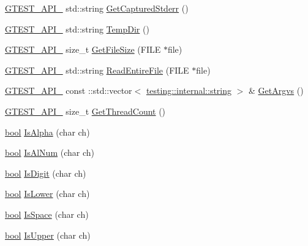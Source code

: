 \begin{DoxyCompactItemize}
\item 
\hyperlink{gtest-port_8h_aa73be6f0ba4a7456180a94904ce17790}{G\+T\+E\+S\+T\+\_\+\+A\+P\+I\+\_\+} std\+::string \hyperlink{namespacetesting_1_1internal_a374156401da17704099d0c33fa53adfb}{Get\+Captured\+Stderr} ()
\item 
\hyperlink{gtest-port_8h_aa73be6f0ba4a7456180a94904ce17790}{G\+T\+E\+S\+T\+\_\+\+A\+P\+I\+\_\+} std\+::string \hyperlink{namespacetesting_1_1internal_a59a959f437bd7d515b5c41dcf00229c9}{Temp\+Dir} ()
\item 
\hyperlink{gtest-port_8h_aa73be6f0ba4a7456180a94904ce17790}{G\+T\+E\+S\+T\+\_\+\+A\+P\+I\+\_\+} size\+\_\+t \hyperlink{namespacetesting_1_1internal_a06ca3f65f5e85c9ce7299b9e4cd52408}{Get\+File\+Size} (F\+I\+LE $\ast$file)
\item 
\hyperlink{gtest-port_8h_aa73be6f0ba4a7456180a94904ce17790}{G\+T\+E\+S\+T\+\_\+\+A\+P\+I\+\_\+} std\+::string \hyperlink{namespacetesting_1_1internal_a2cc0be60c54a8701423fe5297e1349ee}{Read\+Entire\+File} (F\+I\+LE $\ast$file)
\item 
\hyperlink{gtest-port_8h_aa73be6f0ba4a7456180a94904ce17790}{G\+T\+E\+S\+T\+\_\+\+A\+P\+I\+\_\+} const \+::std\+::vector$<$ \hyperlink{namespacetesting_1_1internal_a8e8ff5b11e64078831112677156cb111}{testing\+::internal\+::string} $>$ \& \hyperlink{namespacetesting_1_1internal_a344160f771a3b754fa4e54b6e9846b23}{Get\+Argvs} ()
\item 
\hyperlink{gtest-port_8h_aa73be6f0ba4a7456180a94904ce17790}{G\+T\+E\+S\+T\+\_\+\+A\+P\+I\+\_\+} size\+\_\+t \hyperlink{namespacetesting_1_1internal_a3b9b3649cd04558bf46c75de52a7ef34}{Get\+Thread\+Count} ()
\item 
\hyperlink{classbool}{bool} \hyperlink{namespacetesting_1_1internal_aeb957087fd6bbf9db98ab7cd41b0c129}{Is\+Alpha} (char ch)
\item 
\hyperlink{classbool}{bool} \hyperlink{namespacetesting_1_1internal_a83802e7f23324cd512232203662e1a98}{Is\+Al\+Num} (char ch)
\item 
\hyperlink{classbool}{bool} \hyperlink{namespacetesting_1_1internal_a4bd96b7fa6486802d33ddc217af55a39}{Is\+Digit} (char ch)
\item 
\hyperlink{classbool}{bool} \hyperlink{namespacetesting_1_1internal_ac26ce3883bc8919c27074975e958f3b7}{Is\+Lower} (char ch)
\item 
\hyperlink{classbool}{bool} \hyperlink{namespacetesting_1_1internal_af429e04f70f9c10f6aa76a5d1ccd389f}{Is\+Space} (char ch)
\item 
\hyperlink{classbool}{bool} \hyperlink{namespacetesting_1_1internal_a84f3baa379fec6bf5947cb5165aa8cc9}{Is\+Upper} (char ch)

\end{DoxyCompactItemize}
